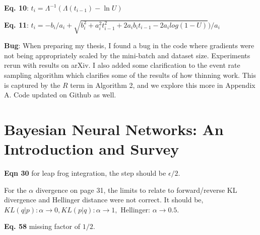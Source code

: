 \documentclass{article}
\begin{document}
\textbf{Eq. 10}: $t_{i} = \Lambda^{-1}(\Lambda(t_{i-1}) - \ln U)$

\textbf{Eq. 11}: $t_{i} =  -b_{i} / a_{i} + \sqrt{b_{i}^{2} +  a_{i}^{2}t_{i-1}^{2} + 2a_{i}b_{i}t_{i-1} - 2a_{i}log(1 - U)}\big ) /a_{i}$

\textbf{Bug}: When preparing my thesis, I found a bug in the code where gradients were not being appropriately scaled by the mini-batch and dataset size. Experiments rerun with results on arXiv. I also added some clarification to the event rate sampling algorithm which clarifies some of the results of how thinning work. This is captured by the $R$ term in Algorithm 2, and we explore this more in Appendix A. Code updated on Github as well.

\vspace*{1cm}
\section{Bayesian Neural Networks: An Introduction and Survey}

\textbf{Eqn 30} for leap frog integration, the step should be $\epsilon/2$.

For the $\alpha$ divergence on page 31, the limits to relate to forward/reverse KL divergence and Hellinger distance were not correct. It should be, $KL(q|p): \alpha \rightarrow 0, KL(p|q): \alpha \rightarrow 1,$ Hellinger: $ \alpha \rightarrow 0.5$.

\textbf{Eq. 58} missing factor of $1/2$.
\end{document}
